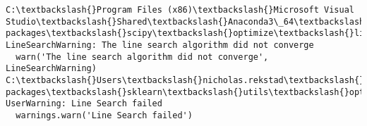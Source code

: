 \documentclass[11pt]{article}
\begin{document}
    \begin{Verbatim}[commandchars=\\\{\}]
C:\textbackslash{}Program Files (x86)\textbackslash{}Microsoft Visual Studio\textbackslash{}Shared\textbackslash{}Anaconda3\_64\textbackslash{}lib\textbackslash{}site-packages\textbackslash{}scipy\textbackslash{}optimize\textbackslash{}linesearch.py:313: LineSearchWarning: The line search algorithm did not converge
  warn('The line search algorithm did not converge', LineSearchWarning)
C:\textbackslash{}Users\textbackslash{}nicholas.rekstad\textbackslash{}AppData\textbackslash{}Roaming\textbackslash{}Python\textbackslash{}Python36\textbackslash{}site-packages\textbackslash{}sklearn\textbackslash{}utils\textbackslash{}optimize.py:195: UserWarning: Line Search failed
  warnings.warn('Line Search failed')

    \end{Verbatim}
\end{document}
